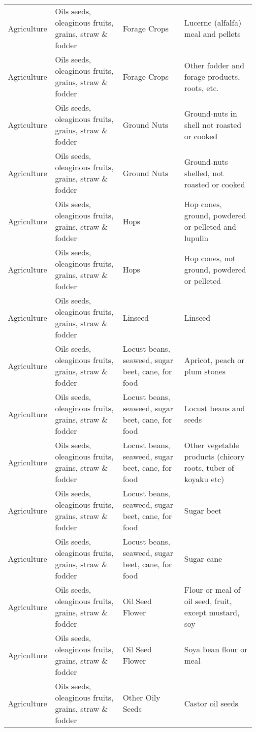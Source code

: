 \begin{appendices}
\begin{xltabular}{\textwidth}{|p{0.07\textwidth}|p{0.28\textwidth}|p{0.24\textwidth}|p{0.31\textwidth}|}
	Agriculture & Oils seeds, oleaginous fruits, grains, straw \& fodder & Forage Crops & Lucerne (alfalfa) meal and pellets \\
	Agriculture & Oils seeds, oleaginous fruits, grains, straw \& fodder & Forage Crops & Other fodder and forage products, roots, etc. \\
	Agriculture & Oils seeds, oleaginous fruits, grains, straw \& fodder & Ground Nuts & Ground-nuts in shell not roasted or cooked \\
	Agriculture & Oils seeds, oleaginous fruits, grains, straw \& fodder & Ground Nuts & Ground-nuts shelled, not roasted or cooked \\
	Agriculture & Oils seeds, oleaginous fruits, grains, straw \& fodder & Hops & Hop cones, ground, powdered or pelleted and lupulin \\
	Agriculture & Oils seeds, oleaginous fruits, grains, straw \& fodder & Hops & Hop cones, not ground, powdered or pelleted \\
	Agriculture & Oils seeds, oleaginous fruits, grains, straw \& fodder & Linseed & Linseed \\
	Agriculture & Oils seeds, oleaginous fruits, grains, straw \& fodder & Locust beans, seaweed, sugar beet, cane, for food & Apricot, peach or plum stones \\
	Agriculture & Oils seeds, oleaginous fruits, grains, straw \& fodder & Locust beans, seaweed, sugar beet, cane, for food & Locust beans and seeds \\
	Agriculture & Oils seeds, oleaginous fruits, grains, straw \& fodder & Locust beans, seaweed, sugar beet, cane, for food & Other vegetable products (chicory roots, tuber of koyaku etc) \\
	Agriculture & Oils seeds, oleaginous fruits, grains, straw \& fodder & Locust beans, seaweed, sugar beet, cane, for food & Sugar beet \\
	Agriculture & Oils seeds, oleaginous fruits, grains, straw \& fodder & Locust beans, seaweed, sugar beet, cane, for food & Sugar cane \\
	Agriculture & Oils seeds, oleaginous fruits, grains, straw \& fodder & Oil Seed Flower & Flour or meal of oil seed, fruit, except mustard, soy \\
	Agriculture & Oils seeds, oleaginous fruits, grains, straw \& fodder & Oil Seed Flower & Soya bean flour or meal \\
	Agriculture & Oils seeds, oleaginous fruits, grains, straw \& fodder & Other Oily Seeds & Castor oil seeds \\

\end{xltabular}
\end{appendices}
